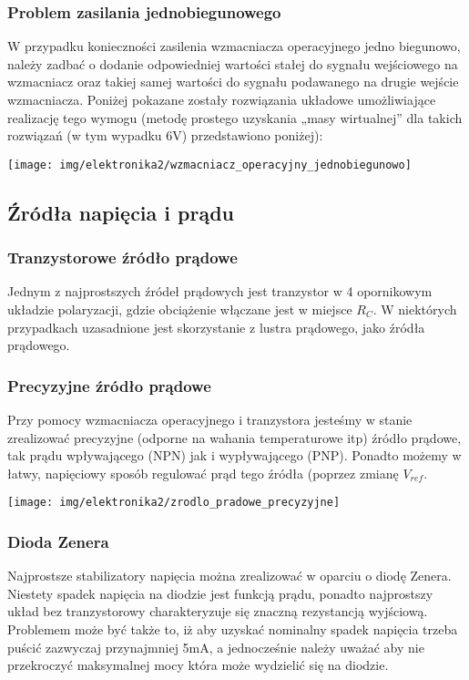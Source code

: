 \documentclass{pdfBooklets}
\begin{document}
\subsubsection{Problem zasilania jednobiegunowego}
W przypadku konieczności zasilenia wzmacniacza operacyjnego jedno biegunowo, należy zadbać o dodanie odpowiedniej wartości stałej do sygnału wejściowego na wzmacniacz oraz takiej samej wartości do sygnału podawanego na drugie wejście wzmacniacza. Poniżej pokazane zostały rozwiązania układowe umożliwiające realizację tego wymogu (metodę prostego uzyskania „masy wirtualnej” dla takich rozwiązań (w tym wypadku 6V) przedstawiono poniżej):

\begin{center}\texttt{[image: img/elektronika2/wzmacniacz\_operacyjny\_jednobiegunowo]}\end{center}

\subsection{Źródła napięcia i prądu}

\subsubsection{Tranzystorowe źródło prądowe}
Jednym z najprostszych źródeł prądowych jest tranzystor w 4 opornikowym układzie polaryzacji, gdzie obciążenie włączane jest w miejsce $R_C$.
W niektórych przypadkach uzasadnione jest skorzystanie z lustra prądowego, jako źródła prądowego.

\subsubsection{Precyzyjne źródło prądowe}
Przy pomocy wzmacniacza operacyjnego i tranzystora jesteśmy w stanie zrealizować precyzyjne (odporne na wahania temperaturowe itp) źródło prądowe, tak prądu wpływającego (NPN) jak i wypływającego (PNP).
Ponadto możemy w łatwy, napięciowy sposób regulować prąd tego źródła (poprzez zmianę $V_{ref}$.

\begin{center}\texttt{[image: img/elektronika2/zrodlo\_pradowe\_precyzyjne]}\end{center}

\subsubsection{Dioda Zenera}
Najprostsze stabilizatory napięcia można zrealizować w oparciu o diodę Zenera.
Niestety spadek napięcia na diodzie jest funkcją prądu, ponadto najprostszy układ bez tranzystorowy charakteryzuje się znaczną rezystancją wyjściową.
Problemem może być także to, iż aby uzyskać nominalny spadek napięcia trzeba puścić zazwyczaj przynajmniej 5mA, a jednocześnie należy uważać aby nie przekroczyć maksymalnej mocy która może wydzielić się na diodzie.
\end{document}
